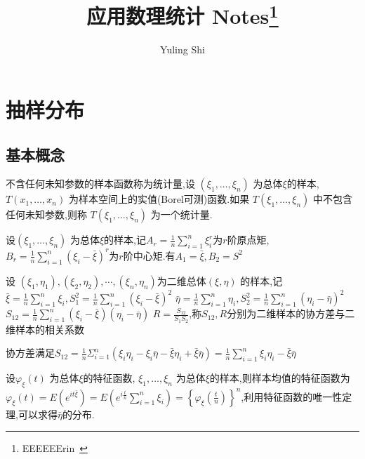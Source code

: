 \documentclass[10pt]{yerbaformat}
\title{应用数理统计 Notes\footnote{EEEEEErin~}}
\date{}
\begin{document}
\author{Yuling Shi}
\maketitle
\tableofcontents
\newpage

\section{抽样分布}
\subsection{基本概念}

\begin{definition}[统计量]
    不含任何未知参数的样本函数称为统计量,设 $\left(\xi_{1}, \ldots, \xi_{n}\right)$ 为总体$\xi$的样本,$T\left(x_{1}, \ldots, x_{n}\right)$ 为样本空间上的实值(Borel可测)函数.如果 $T\left(\xi_{1}, \ldots, \xi_{n}\right)$ 中不包含任何未知参数,则称 $T\left(\xi_{1}, \ldots, \xi_{n}\right)$ 为一个统计量.
\end{definition}

\begin{definition}[矩]
    设$\left(\xi_{1}, \ldots, \xi_{n}\right)$ 为总体$\xi$的样本,记$A_{r}=\frac{1}{n} \sum_{i=1}^{n} \xi_{i}^{r}$为$r$阶原点矩,$ B_{r}=\frac{1}{n} \sum_{i=1}^{n}\left(\xi_{i}-\bar{\xi}\right)^{r}$为$r$阶中心矩.有$A_{1}=\bar{\xi}, B_{2}=S^{2}$
\end{definition}

\begin{definition}[相关系数]
    设 $\left(\xi_{1}, \eta_{1}\right),\left(\xi_{2}, \eta_{2}\right), \cdots,\left(\xi_{n}, \eta_{n}\right)$为二维总体$(\xi, \eta)$ 的样本,记$\bar{\xi}=\frac{1}{n} \sum_{i=1}^{n} \xi_{i}, S_{1}^{2}=\frac{1}{n} \sum_{i=1}^{n}\left(\xi_{i}-\bar{\xi}\right)^{2}$
    $\bar{\eta}=\frac{1}{n} \sum_{i=1}^{n} \eta_{i}, S_{2}^{2}=\frac{1}{n} \sum_{i=1}^{n}\left(\eta_{i}-\bar{\eta}\right)^{2}$
    $S_{12}=\frac{1}{n} \sum_{i=1}^{n}\left(\xi_{i}-\bar{\xi}\right)\left(\eta_{i}-\bar{\eta}\right)$
    $R=\frac{S_{12}}{S_{1} S_{2}}$,称$S_{12}, R$分别为二维样本的协方差与二维样本的相关系数
\end{definition}

\par 协方差满足$S_{12}=\frac{1}{n} \Sigma_{i=1}^{n}\left(\xi_{i} \eta_{i}-\xi_{i} \bar{\eta}-\bar{\xi} \eta_{i}+\bar{\xi} \bar{\eta}\right)=\frac{1}{n} \sum_{i=1}^{n} \xi_{i} \eta_{i}-\bar{\xi} \bar{\eta}$

\begin{definition}[特征函数]
    设$\varphi_{\xi}(t)$ 为总体$\xi$的特征函数, $\xi_{1}, \ldots, \xi_{n}$ 为总体$\xi$的样本,则样本均值的特征函数为$\varphi_{\xi}(t)=E\left(e^{i t \bar{\xi}}\right)=E\left(e^{i \frac{t}{n}} \sum_{i=1}^{n} \xi_{i}\right)=\left\{\varphi_{\xi}\left(\frac{t}{n}\right)\right\}^{n}$,利用特征函数的唯一性定理,可以求得$\bar{\eta}$的分布.
\end{definition}
\end{document}
